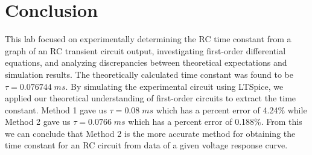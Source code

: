 \documentclass[11pt]{article}
\begin{document}
\section*{Conclusion}
This lab focused on experimentally determining the RC time constant from a graph of an RC transient circuit output, investigating first-order differential equations, and analyzing discrepancies between theoretical expectations and simulation results. The theoretically calculated time constant was found to be $\tau = 0.076744 \; ms$. By simulating the experimental circuit using LTSpice, we applied our theoretical understanding of first-order circuits to extract the time constant. Method 1 gave us $\tau = 0.08 \; ms$ which has a percent error of 4.24\% while Method 2 gave us $\tau = 0.0766\;ms$ which has a percent error of 0.188\%. From this we can conclude that Method 2 is the more accurate method for obtaining the time constant for an RC circuit from data of a given voltage response curve.
\end{document}

